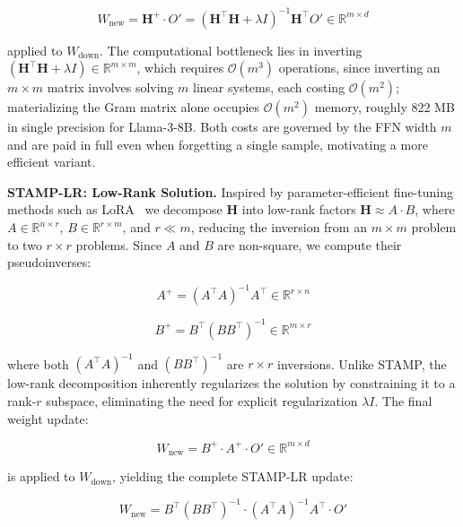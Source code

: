 \begin{equation}
W_{\text{new}} = \mathbf{H}^+ \cdot O' = (\mathbf{H}^\top \mathbf{H} + \lambda I)^{-1} \mathbf{H}^\top O' \in \mathbb{R}^{m \times d}
\label{eq:pseudoinverse}
\end{equation}

applied to $W_{\text{down}}$. The computational bottleneck lies in inverting $(\mathbf{H}^\top \mathbf{H} + \lambda I) \in \mathbb{R}^{m \times m}$, which requires $\mathcal{O}(m^3)$ operations, since inverting an $m \times m$ matrix involves solving $m$ linear systems, each costing $\mathcal{O}(m^2)$; materializing the Gram matrix alone occupies $\mathcal{O}(m^2)$ memory, roughly 822 MB in single precision for Llama-3-8B. Both costs are governed by the FFN width $m$ and are paid in full even when forgetting a single sample, motivating a more efficient variant.

\medskip
\noindent
\textbf{STAMP-LR: Low-Rank Solution.} Inspired by parameter-efficient fine-tuning methods such as LoRA~\citeauthor{hu2022lora} we decompose $\mathbf{H}$ into low-rank factors $\mathbf{H} \approx A \cdot B$, where $A \in \mathbb{R}^{n \times r}$, $B \in \mathbb{R}^{r \times m}$, and $r \ll m$, reducing the inversion from an $m \times m$ problem to two $r \times r$ problems. Since $A$ and $B$ are non-square, we compute their pseudoinverses:

\begin{equation}
A^+ = (A^\top A)^{-1} A^\top \in \mathbb{R}^{r \times n}
\label{eq:a_pseudo}
\end{equation}

\begin{equation}
B^+ = B^\top (BB^\top)^{-1} \in \mathbb{R}^{m \times r}
\label{eq:b_pseudo}
\end{equation}

where both $(A^\top A)^{-1}$ and $(BB^\top)^{-1}$ are $r \times r$ inversions. Unlike STAMP, the low-rank decomposition inherently regularizes the solution by constraining it to a rank-$r$ subspace, eliminating the need for explicit regularization $\lambda I$. The final weight update:

\begin{equation}
W_{\text{new}} = B^+ \cdot A^+ \cdot O' \in \mathbb{R}^{m \times d}
\label{eq:lr_update}
\end{equation}

is applied to $W_{\text{down}}$, yielding the complete STAMP-LR update:

\begin{equation}
W_{\text{new}} = B^\top (BB^\top)^{-1} \cdot (A^\top A)^{-1} A^\top \cdot O'
\label{eq:lr_expanded}
\end{equation}

